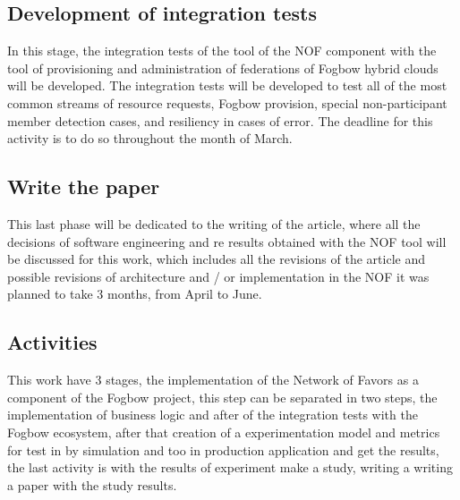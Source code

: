 \documentclass{article}
\begin{document}
\subsection{Development of integration tests}
    In this stage, the integration tests of the tool of the NOF component with the tool of provisioning and administration of federations of Fogbow hybrid clouds will be developed. The integration tests will be developed to test all of the most common streams of resource requests, Fogbow provision, special non-participant member detection cases, and resiliency in cases of error. The deadline for this activity is to do so throughout the month of March.
\subsection{Write the paper}
    This last phase will be dedicated to the writing of the article, where all the decisions of software engineering and re results obtained with the NOF tool will be discussed for this work, which includes all the revisions of the article and possible revisions of architecture and / or implementation in the NOF it was planned to take 3 months, from April to June.

\subsection{Activities}
This work have 3 stages, the implementation of the Network of Favors as a component of the Fogbow project, this step can be separated in two steps, the implementation of business logic and after of the integration tests with the Fogbow ecosystem, after that creation of a experimentation model and metrics for test in by simulation and too in production application and get the results, the last activity is with the results of experiment make a study, writing a writing a paper with the study results.
\end{document}
